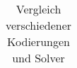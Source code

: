 \begin{landscape}
\begin{table}[H]
\begin{tabular}{|c|c|c|c|l|c|c|c|c|c|c|c|c|c|}
            \hline
            \hline
            \hline
        \end{tabular}
        \caption{Vergleich verschiedener Kodierungen und Solver}
        \label{tab:vglkodierungliberal}
    \end{table}
\end{landscape}